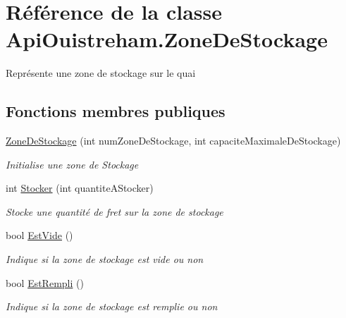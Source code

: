 \hypertarget{class_api_ouistreham_1_1_zone_de_stockage}{}\section{Référence de la classe Api\+Ouistreham.\+Zone\+De\+Stockage}
\label{class_api_ouistreham_1_1_zone_de_stockage}


Représente une zone de stockage sur le quai  


\subsection*{Fonctions membres publiques}
\begin{DoxyCompactItemize}
\item 
\hyperlink{class_api_ouistreham_1_1_zone_de_stockage_ac8f34a75af6e8fc70a8b4557daf25f0c}{Zone\+De\+Stockage} (int num\+Zone\+De\+Stockage, int capacite\+Maximale\+De\+Stockage)
\begin{DoxyCompactList}\small\item\em Initialise une zone de Stockage \end{DoxyCompactList}\item 
int \hyperlink{class_api_ouistreham_1_1_zone_de_stockage_a4ae0eac3069a28360611f527471dd443}{Stocker} (int quantite\+A\+Stocker)
\begin{DoxyCompactList}\small\item\em Stocke une quantité de fret sur la zone de stockage \end{DoxyCompactList}\item 
bool \hyperlink{class_api_ouistreham_1_1_zone_de_stockage_a04b272fa2b5792ebdb7d4071f1ea5189}{Est\+Vide} ()
\begin{DoxyCompactList}\small\item\em Indique si la zone de stockage est vide ou non \end{DoxyCompactList}\item 
bool \hyperlink{class_api_ouistreham_1_1_zone_de_stockage_a1eccb93eee9a439dbe470c88ea2bb4ca}{Est\+Rempli} ()
\begin{DoxyCompactList}\small\item\em Indique si la zone de stockage est remplie ou non \end{DoxyCompactList}\end{DoxyCompactItemize}
